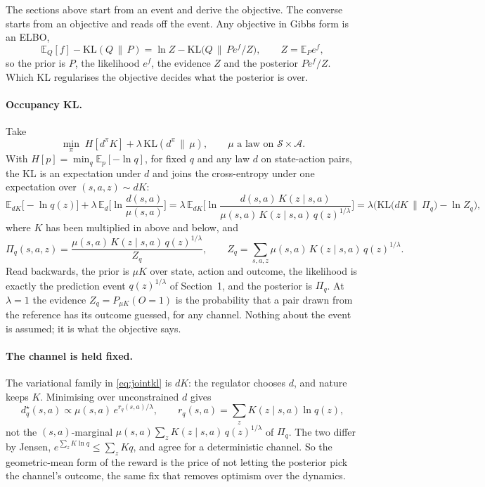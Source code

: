 \documentclass[10pt]{article}
\newcommand{\dpi}{d^\pi}
\newcommand{\E}{\mathbb E}
\begin{document}
The sections above start from an event and derive the objective. The converse starts from an objective and reads off the event. Any objective in Gibbs form is an ELBO,
\begin{equation}
  \E_Q[f] - \mathrm{KL}(Q\,\|\,P) = \ln Z - \mathrm{KL}\big(Q \,\big\|\, P e^{f}/Z\big), \qquad Z = \E_P e^{f},
\end{equation}
so the prior is $P$, the likelihood $e^f$, the evidence $Z$ and the posterior $P e^f/Z$. Which KL regularises the objective decides what the posterior is over.

\paragraph{Occupancy KL.} Take
\begin{equation}
  \min_\pi\; H[\dpi K] + \lambda\, \mathrm{KL}(\dpi \,\|\, \mu), \qquad \mu \text{ a law on } \mathcal S\times\mathcal A .
  \label{eq:occkl}
\end{equation}
With $H[p] = \min_q \E_p[-\ln q]$, for fixed $q$ and any law $d$ on state-action pairs, the KL is an expectation under $d$ and joins the cross-entropy under one expectation over $(s,a,z) \sim dK$:
\begin{equation}
  \E_{dK}\big[-\ln q(z)\big] + \lambda\, \E_d\Big[\ln \frac{d(s,a)}{\mu(s,a)}\Big]
  = \lambda\, \E_{dK}\Big[ \ln \frac{d(s,a)\,K(z\mid s,a)}{\mu(s,a)\,K(z\mid s,a)\,q(z)^{1/\lambda}} \Big]
  = \lambda\Big( \mathrm{KL}\big(dK \,\big\|\, \Pi_q\big) - \ln Z_q \Big),
  \label{eq:jointkl}
\end{equation}
where $K$ has been multiplied in above and below, and
\begin{equation}
  \Pi_q(s,a,z) = \frac{\mu(s,a)\,K(z\mid s,a)\,q(z)^{1/\lambda}}{Z_q}, \qquad Z_q = \sum_{s,a,z} \mu(s,a)\,K(z\mid s,a)\,q(z)^{1/\lambda}.
\end{equation}
Read backwards, the prior is $\mu K$ over state, action and outcome, the likelihood is exactly the prediction event $q(z)^{1/\lambda}$ of Section~1, and the posterior is $\Pi_q$. At $\lambda=1$ the evidence $Z_q = P_{\mu K}(O=1)$ is the probability that a pair drawn from the reference has its outcome guessed, for any channel. Nothing about the event is assumed; it is what the objective says.

\paragraph{The channel is held fixed.} The variational family in \eqref{eq:jointkl} is $dK$: the regulator chooses $d$, and nature keeps $K$. Minimising over unconstrained $d$ gives
\begin{equation}
  d^\star_q(s,a) \propto \mu(s,a)\, e^{r_q(s,a)/\lambda}, \qquad r_q(s,a) = \sum_z K(z\mid s,a)\ln q(z),
\end{equation}
not the $(s,a)$-marginal $\mu(s,a)\sum_z K(z\mid s,a)\, q(z)^{1/\lambda}$ of $\Pi_q$. The two differ by Jensen, $e^{\sum_z K \ln q} \le \sum_z K q$, and agree for a deterministic channel. So the geometric-mean form of the reward is the price of not letting the posterior pick the channel's outcome, the same fix that removes optimism over the dynamics.
\end{document}
